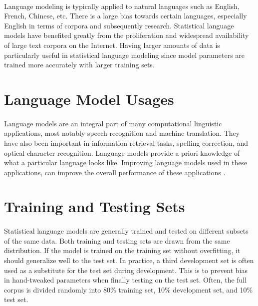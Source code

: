 \paragraph{}
Language modeling is typically applied to natural languages such as English, French, Chinese, etc. There is a large bias towards certain languages, especially English in terms of corpora and subsequently research. Statistical language models have benefited greatly from the proliferation and widespread availability of large text corpora on the Internet.  Having larger amounts of data is particularly useful in statistical language modeling since model parameters are trained more accurately with larger training sets. 

\section{Language Model Usages}
\paragraph{}
Language models are an integral part of many computational linguistic applications, most notably speech recognition and machine translation. They have also been important in information retrieval tasks, spelling correction, and optical character recognition. Language models provide a priori knowledge of what a particular language looks like. Improving language models used in these applications, can improve the overall performance of these applications \cite{Jurafsky2009}. 

\section{Training and Testing Sets}
\paragraph{}
Statistical language models are generally trained and tested on different subsets of the same data. Both training and testing sets are drawn from the same distribution. If the model is trained on the training set without overfitting, it should generalize well to the test set. In practice, a third development set is often used as a substitute for the test set during development. This is to prevent bias in hand-tweaked parameters when finally testing on the test set. Often, the full corpus is divided randomly into 80\% training set, 10\% development set, and 10\% test set.

